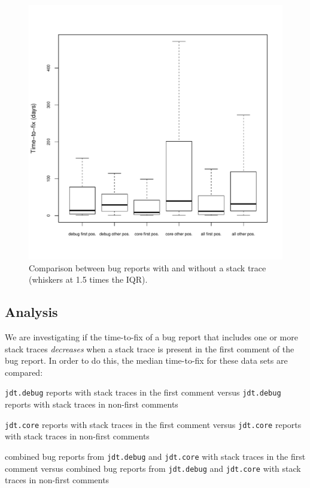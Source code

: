 \begin{figure}[!ht]
	\centering
		\includegraphics[width=1\textwidth]{img/ttf_stacktrace_pos.pdf}
	\caption{Comparison between bug reports with and without a stack trace (whiskers at 1.5 times the IQR).}
	\label{fig:ttf_pos_stats}
\end{figure}


\subsection{Analysis} %
We are investigating if the time-to-fix of a bug report that includes one or more stack traces \emph{decreases} when a stack trace is present in the first comment of the bug report. In order to do this, the median time-to-fix for these data sets are compared:

\begin{itemize*}
	\item \texttt{jdt.debug} reports with stack traces in the first comment versus \texttt{jdt.debug} reports with stack traces in non-first comments
	\item \texttt{jdt.core} reports with stack traces in the first comment versus \texttt{jdt.core} reports with stack traces in non-first comments
	\item combined bug reports from \texttt{jdt.debug} and \texttt{jdt.core} with stack traces in the first comment versus combined bug reports from \texttt{jdt.debug} and \texttt{jdt.core} with stack traces in non-first comments
\end{itemize*}

